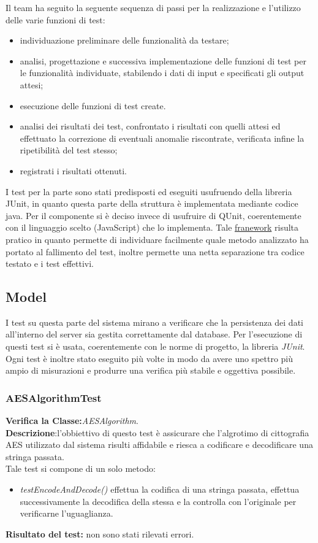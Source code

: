 Il team ha seguito la seguente sequenza di passi per la realizzazione e l'utilizzo delle varie funzioni di test:
\begin{itemize}
\item individuazione preliminare delle funzionalità da testare;
\item analisi, progettazione e successiva implementazione delle funzioni di test per le funzionalità individuate, stabilendo i dati di input e specificati gli output attesi;
\item esecuzione delle funzioni di test create.
\item analisi dei risultati dei test, confrontato i risultati con quelli attesi ed effettuato la correzione di eventuali anomalie riscontrate, verificata infine la ripetibilità del test stesso;
\item registrati i risultati ottenuti.
\end{itemize}

I test per la parte  sono stati predisposti ed eseguiti usufruendo della libreria JUnit, in quanto questa parte della struttura è implementata mediante codice java.
Per il componente  si è deciso invece di usufruire di QUnit, coerentemente con il linguaggio scelto (JavaScript) che lo implementa. Tale \underline{franework} risulta pratico in quanto permette di individuare facilmente quale metodo analizzato ha portato al fallimento del test, inoltre permette una netta separazione tra codice testato e i test effettivi.

\subsection{Model}
I test su questa parte del sistema mirano a verificare che la persistenza dei dati all'interno del server sia gestita correttamente dal database.
Per l'esecuzione di questi test si è usata, coerentemente con le norme di progetto, la libreria \textit{JUnit}.
Ogni test è inoltre stato eseguito più volte in modo da avere uno spettro più ampio di misurazioni e produrre una verifica più stabile e oggettiva possibile.

\subsubsection{AESAlgorithmTest}
\textbf{Verifica la Classe:}\textit{AESAlgorithm}.\\
\textbf{Descrizione}:l'obbiettivo di questo test è assicurare che l'algrotimo di cittografia AES utilizzato dal sistema \caName risulti affidabile e riesca a codificare e decodificare una stringa passata.\\
Tale test si compone di un solo metodo:
\begin{itemize}
\item \textit{testEncodeAndDecode() } effettua la codifica di una stringa passata, effettua successivamente la decodifica della stessa e la controlla con l'originale per verificarne l'uguaglianza.
\end{itemize}
\textbf{Risultato del test:} non sono stati rilevati errori.


